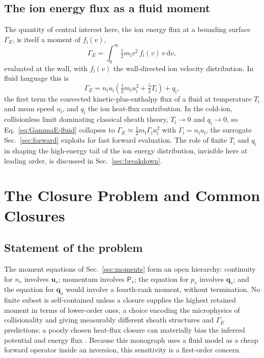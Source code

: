 \subsection{The ion energy flux as a fluid moment}

The quantity of central interest here, the ion energy flux at a bounding surface $\Gamma_{E}$, is itself a moment of $f_{\mathrm{i}}(v)$,
\begin{equation}
\Gamma_{E} = \int_0^{\infty} \tfrac{1}{2}m_{\mathrm{i}} v^2 \, f_{\mathrm{i}}(v)\, v\,\mathrm{d}v,
\label{eq:GammaE-kinetic}
\end{equation}
evaluated at the wall, with $f_{\mathrm{i}}(v)$ the wall-directed ion velocity distribution. In fluid language this is
\begin{equation}
\Gamma_{E} = n_{\mathrm{i}} u_{\mathrm{i}}\left(\tfrac{1}{2}m_{\mathrm{i}}u_{\mathrm{i}}^2 + \tfrac{5}{2}T_{\mathrm{i}}\right) + q_{\mathrm{i}},
\label{eq:GammaE-fluid}
\end{equation}
the first term the convected kinetic-plus-enthalpy flux of a fluid at temperature $T_{\mathrm{i}}$ and mean speed $u_{\mathrm{i}}$, and $q_{\mathrm{i}}$ the ion heat-flux contribution. In the cold-ion, collisionless limit dominating classical sheath theory, $T_{\mathrm{i}}\to0$ and $q_{\mathrm{i}}\to0$, so Eq.~\eqref{eq:GammaE-fluid} collapses to $\Gamma_E \simeq \tfrac{1}{2}m_{\mathrm{i}}\Gamma_{\mathrm{i}}u_{\mathrm{i}}^2$ with $\Gamma_{\mathrm{i}}=n_{\mathrm{i}}u_{\mathrm{i}}$, the surrogate Sec.~\ref{sec:forward} exploits for fast forward evaluation. The role of finite $T_{\mathrm{i}}$ and $q_{\mathrm{i}}$ in shaping the high-energy tail of the ion energy distribution, invisible here at leading order, is discussed in Sec.~\ref{sec:breakdown}.

\section{The Closure Problem and Common Closures}
\label{sec:closure}

\subsection{Statement of the problem}

The moment equations of Sec.~\ref{sec:moments} form an open hierarchy: continuity for $n_s$ involves $\mathbf{u}_s$; momentum involves $\mathsf{P}_s$; the equation for $p_s$ involves $\mathbf{q}_s$; and the equation for $\mathbf{q}_s$ would involve a fourth-rank moment, without termination. No finite subset is self-contained unless a closure supplies the highest retained moment in terms of lower-order ones, a choice encoding the microphysics of collisionality and giving measurably different sheath structures and $\Gamma_E$ predictions: a poorly chosen heat-flux closure can materially bias the inferred potential and energy flux \cite{ref0101}. Because this monograph uses a fluid model as a cheap forward operator inside an inversion, this sensitivity is a first-order concern.

